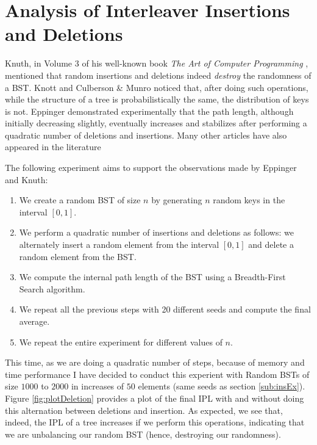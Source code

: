 \section{Analysis of Interleaver Insertions and Deletions}
Knuth, in Volume 3 of his well-known book \textit{The Art of Computer Programming} \cite{knuth1998art}, mentioned that random insertions and deletions indeed \textit{destroy} the randomness of a BST. Knott\cite{knott1975deletion} and Culberson \& Munro\cite{culberson1990analysis} noticed that, after doing such operations, while the structure of a tree is probabilistically the same, the distribution of keys is not. Eppinger\cite{eppinger1983empirical} demonstrated experimentally that the path length, although initially decreasing slightly, eventually increases and stabilizes after performing a quadratic number of deletions and insertions. Many other articles have also appeared in the literature\cite{jonassen1978trivial, knuth1977deletions}

The following experiment aims to support the observations made by Eppinger and Knuth:
\begin{enumerate}
    \item We create a random BST of size \( n \) by generating \( n \) random keys in the interval \( [0,1] \).
    \item We perform a quadratic number of insertions and deletions as follows: we alternately insert a random element from the interval \( [0,1] \) and delete a random element from the BST.
    \item We compute the internal path length of the BST using a Breadth-First Search algorithm.
    \item We repeat all the previous steps with 20 different seeds and compute the final average.
    \item We repeat the entire experiment for different values of \( n \).
\end{enumerate}

This time, as we are doing a quadratic number of steps, because of memory and time performance I have decided to conduct this experient with Random BSTs of size $1000$ to $2000$ in increases of $50$ elements (same seeds as section \ref{sub:insEx}). Figure \ref{fig:plotDeletion} provides a plot of the final IPL with and without doing this alternation between deletions and insertion. As expected, we see that, indeed, the IPL of a tree increases if we perform this operations, indicating that we are unbalancing our random BST (hence, destroying our randomness).

